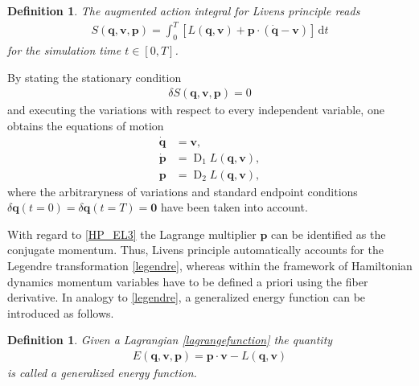 \documentclass{multibody2023_full_paper}
\newtheorem{definition}[theorem]{Definition}
\newcommand{\dt}{\mathrm{d}t}
\DeclareMathOperator{\D}{D}
\renewcommand{\vec}[1]{\ensuremath{\mbox{$\mathbf{#1}$}}}
\begin{document}
\begin{definition}
    The augmented action integral for Livens principle reads
    \begin{align}
        S(\vec{q},\vec{v},\vec{p}) = \int_0^T \left[ L(\vec{q},\vec{v}) + \vec{p} \cdot(\dot{\vec{q}} - \vec{v}) \right] \, \dt \label{livens_principle}
    \end{align}
    for the simulation time $t \in [0, T]$.
\end{definition}
By stating the stationary condition
\begin{align}
    \delta S( \vec{q},\vec{v}, \vec{p}) = 0
\end{align}
and executing the variations with respect to every independent variable, one obtains the equations of motion
\begin{subequations}
    \label{HP_EL}
    \begin{align}
        \dot{\vec{q}} & = \vec{v} \label{HP_EL1} ,                  \\
        \dot{\vec{p}} & = \D_1 L(\vec{q},\vec{v})  \label{HP_EL2} , \\
        \vec{p}       & = \D_2 L(\vec{q},\vec{v}) \label{HP_EL3},
    \end{align}
\end{subequations}
where the arbitraryness of variations and standard endpoint conditions $\delta \vec{q}(t=0) = \delta \vec{q}(t=T) = \vec{0}$ have been taken into account.

With regard to \eqref{HP_EL3} the Lagrange multiplier $\vec{p}$ can be identified as the conjugate momentum. Thus, Livens principle automatically accounts for the Legendre transformation \eqref{legendre}, whereas within the framework of Hamiltonian dynamics momentum variables have to be defined a priori using the fiber derivative. In analogy to \eqref{legendre}, a generalized energy function can be introduced as follows.
\begin{definition}
    Given a Lagrangian \eqref{lagrangefunction} the quantity
    \begin{align}
        E(\vec{q},\vec{v},\vec{p}) = \vec{p} \cdot \vec{v} - L(\vec{q},\vec{v}) \label{generalized_energy}
    \end{align}
    is called a generalized energy function.
\end{definition}
\end{document}
